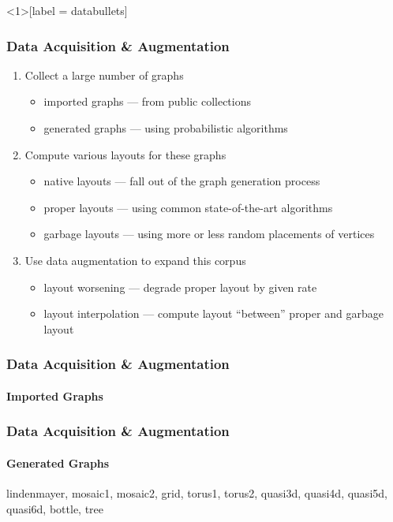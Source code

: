 \documentclass{beamer}
\begin{document}
\begin{frame}<1>[label = databullets]
  \frametitle{Data Acquisition {\&} Augmentation}
  \begin{enumerate}
  \item<1-> Collect a large number of graphs
    \begin{itemize}
    \item\alert{imported graphs} --- from public collections
    \item\alert{generated graphs} --- using probabilistic algorithms
    \end{itemize}
    \par\bigskip
  \item<2-> Compute various layouts for these graphs
    \begin{itemize}
    \item\alert{native layouts} --- fall out of the graph generation process
    \item\alert{proper layouts} --- using common state-of-the-art algorithms
    \item\alert{garbage layouts} --- using more or less random placements of vertices
    \end{itemize}
    \par\bigskip
  \item<3-> Use data augmentation to expand this corpus
    \begin{itemize}
    \item\alert{layout worsening} --- degrade proper layout by given rate
    \item\alert{layout interpolation} --- compute layout \enquote{between} proper and garbage layout
    \end{itemize}
  \end{enumerate}
\end{frame}

\begin{frame}
  \frametitle{Data Acquisition {\&} Augmentation}
  \framesubtitle{Imported Graphs}
  \newcommand*{\RandomSeed}{42}
\end{frame}

\begin{frame}
  \frametitle{Data Acquisition {\&} Augmentation}
  \framesubtitle{Generated Graphs}
  \newcommand*{\RandomSeed}{100}
  \RandomThumbnailDemo%
      {lindenmayer, mosaic1, mosaic2, grid, torus1, torus2, quasi3d, quasi4d, quasi5d, quasi6d, bottle, tree}
\end{frame}
\end{document}
